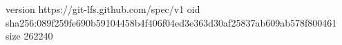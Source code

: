 version https://git-lfs.github.com/spec/v1
oid sha256:089f259fe690b59104458b4f406f04ed3e363d30af25837ab609ab578f800461
size 262240
